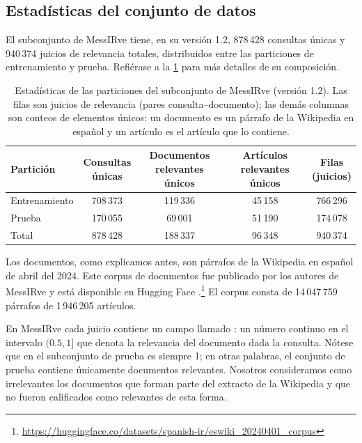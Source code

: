 \subsection{Estadísticas del conjunto de datos}
El subconjunto  de MessIRve tiene, en su versión 1.2, 878\,428 consultas únicas y 940\,374 juicios de relevancia totales, distribuidos entre las particiones de entrenamiento y prueba. Refiérase a la \cref{tab:messirve-particiones} para más detalles de su composición.

\begin{table}[tbp]
	\centering
	\begin{tabular}{@{}lcccc@{}}
		\toprule
		Partición & \shortstack{Consultas\\únicas} & \shortstack{Documentos\\relevantes únicos} & \shortstack{Artículos\\relevantes únicos} & \shortstack{Filas\\(juicios)} \\
		\midrule
		Entrenamiento & 708\,373 & 119\,336 & 45\,158 & 766\,296 \\
		Prueba        & 170\,055 &  69\,001 & 51\,190 & 174\,078 \\
		\midrule
		Total         & 878\,428 & 188\,337 & 96\,348 & 940\,374 \\
		\bottomrule
	\end{tabular}
	\caption{Estadísticas de las particiones del subconjunto  de MessIRve (versión 1.2). Las filas son juicios de relevancia (pares consulta--documento); las demás columnas son conteos de elementos únicos: un documento es un párrafo de la Wikipedia en español y un artículo es el artículo que lo contiene.}
	\label{tab:messirve-particiones}
\end{table}

Los documentos, como explicamos antes, son párrafos de la Wikipedia en español de abril del 2024. Este corpus de documentos fue publicado por los autores de MessIRve y está disponible en Hugging Face \parencite{eswiki-HuggingFace2024}.\footnote{\url{https://huggingface.co/datasets/spanish-ir/eswiki_20240401_corpus}} El corpus consta de 14\,047\,759 párrafos de 1\,946\,205 artículos. 

En MessIRve cada juicio contiene un campo llamado : un número continuo en el intervalo $(0.5, 1]$ que denota la relevancia del documento dada la consulta. Nótese que en el subconjunto de prueba  es siempre 1; en otras palabras, el conjunto de prueba contiene únicamente documentos relevantes. Nosotros consideramos como irrelevantes los documentos que forman parte del extracto de la Wikipedia y que no fueron calificados como relevantes de esta forma.

